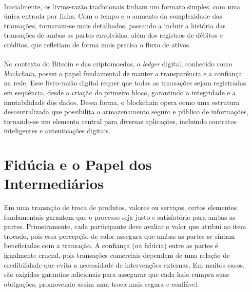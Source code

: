 \documentclass[letterpaper,11pt,leqno]{article}
\begin{document}
\paragraph{}
Inicialmente, os livros-razão tradicionais tinham um formato simples, com uma
única entrada por linha. Com o tempo e o aumento da complexidade das transações,
tornaram-se mais detalhados, passando a incluir a história das transações de
ambas as partes envolvidas, além dos registros de débitos e créditos, que
refletiam de forma mais precisa o fluxo de ativos.

\paragraph{}
No contexto do Bitcoin e das criptomoedas, o \textit{ledger} digital, conhecido
como \textit{blockchain}, possui o papel fundamental de manter a transparência e
a confiança na rede. Esse livro-razão digital requer que todas as transações
sejam registradas em sequência, desde a criação do primeiro bloco, garantindo a
integridade e a imutabilidade dos dados. Dessa forma, o blockchain opera como
uma estrutura descentralizada que possibilita o armazenamento seguro e público
de informações, tornando-se um elemento central para diversas aplicações,
incluindo contratos inteligentes e autenticações digitais.

\section{Fidúcia e o Papel dos Intermediários}

\paragraph{}
Em uma transação de troca de produtos, valores ou serviços, certos elementos
fundamentais garantem que o processo seja justo e satisfatório para ambas as
partes. Primeiramente, cada participante deve avaliar o valor que atribui ao
item trocado, pois essa percepção de valor assegura que ambas as partes se
sintam beneficiadas com a transação. A confiança (ou fidúcia) entre as partes é
igualmente crucial, pois transações comerciais dependem de uma relação de
credibilidade que evita a necessidade de intervenções externas. Em muitos casos,
são exigidas garantias adicionais para assegurar que cada lado cumpra suas
obrigações, promovendo assim uma troca mais segura e confiável.
\end{document}
